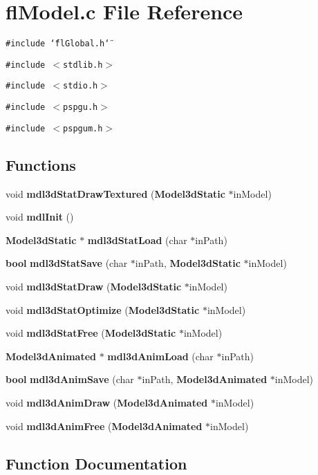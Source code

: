 \section{fl\-Model.c File Reference}
\label{flModel_8c}
{\tt \#include \char`\"{}fl\-Global.h\char`\"{}}\par
{\tt \#include $<$stdlib.h$>$}\par
{\tt \#include $<$stdio.h$>$}\par
{\tt \#include $<$pspgu.h$>$}\par
{\tt \#include $<$pspgum.h$>$}\par
\subsection*{Functions}
\begin{CompactItemize}
\item 
void {\bf mdl3d\-Stat\-Draw\-Textured} ({\bf Model3d\-Static} $\ast$in\-Model)
\item 
void {\bf mdl\-Init} ()
\item 
{\bf Model3d\-Static} $\ast$ {\bf mdl3d\-Stat\-Load} (char $\ast$in\-Path)
\item 
{\bf bool} {\bf mdl3d\-Stat\-Save} (char $\ast$in\-Path, {\bf Model3d\-Static} $\ast$in\-Model)
\item 
void {\bf mdl3d\-Stat\-Draw} ({\bf Model3d\-Static} $\ast$in\-Model)
\item 
void {\bf mdl3d\-Stat\-Optimize} ({\bf Model3d\-Static} $\ast$in\-Model)
\item 
void {\bf mdl3d\-Stat\-Free} ({\bf Model3d\-Static} $\ast$in\-Model)
\item 
{\bf Model3d\-Animated} $\ast$ {\bf mdl3d\-Anim\-Load} (char $\ast$in\-Path)
\item 
{\bf bool} {\bf mdl3d\-Anim\-Save} (char $\ast$in\-Path, {\bf Model3d\-Animated} $\ast$in\-Model)
\item 
void {\bf mdl3d\-Anim\-Draw} ({\bf Model3d\-Animated} $\ast$in\-Model)
\item 
void {\bf mdl3d\-Anim\-Free} ({\bf Model3d\-Animated} $\ast$in\-Model)
\end{CompactItemize}


\subsection{Function Documentation}
